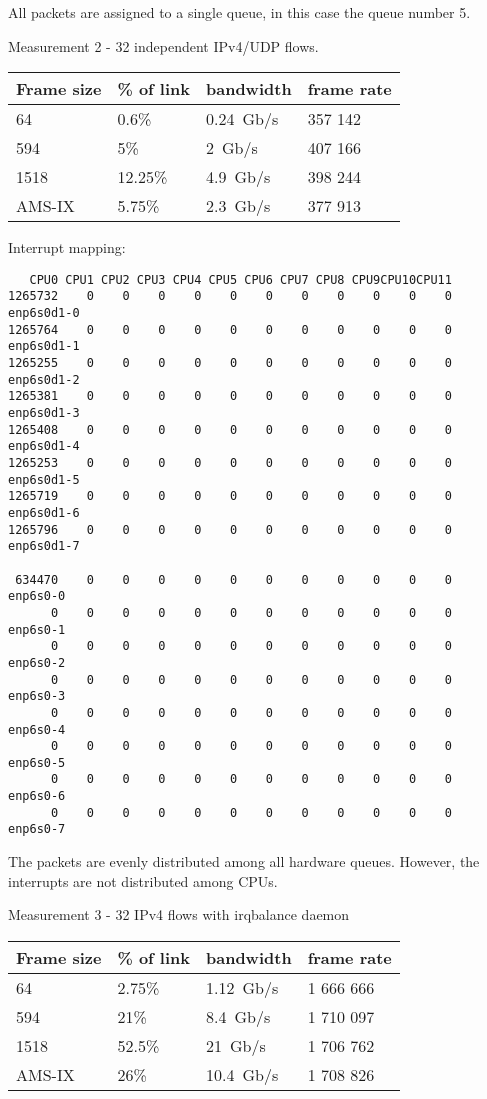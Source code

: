 All packets are assigned to a single queue, in this case the queue number 5.


\newpage
Measurement 2 - 32 independent IPv4/UDP flows.

\begin{tabular}{ | l | l | l | l | }
\hline
Frame size & \% of link & bandwidth & frame rate \\
\hline
64     & 0.6\%   & 0.24~Gb/s & 357 142 \\ %
594    & 5\%     & 2~Gb/s    & 407 166 \\ %
1518   & 12.25\% & 4.9~Gb/s  & 398 244 \\ %
AMS-IX & 5.75\%  & 2.3~Gb/s  & 377 913 \\ %
\hline
\end{tabular}

Interrupt mapping:
\begin{lstlisting}
   CPU0 CPU1 CPU2 CPU3 CPU4 CPU5 CPU6 CPU7 CPU8 CPU9CPU10CPU11 
1265732    0    0    0    0    0    0    0    0    0    0    0  enp6s0d1-0
1265764    0    0    0    0    0    0    0    0    0    0    0  enp6s0d1-1
1265255    0    0    0    0    0    0    0    0    0    0    0  enp6s0d1-2
1265381    0    0    0    0    0    0    0    0    0    0    0  enp6s0d1-3
1265408    0    0    0    0    0    0    0    0    0    0    0  enp6s0d1-4
1265253    0    0    0    0    0    0    0    0    0    0    0  enp6s0d1-5
1265719    0    0    0    0    0    0    0    0    0    0    0  enp6s0d1-6
1265796    0    0    0    0    0    0    0    0    0    0    0  enp6s0d1-7

 634470    0    0    0    0    0    0    0    0    0    0    0  enp6s0-0
      0    0    0    0    0    0    0    0    0    0    0    0  enp6s0-1
      0    0    0    0    0    0    0    0    0    0    0    0  enp6s0-2
      0    0    0    0    0    0    0    0    0    0    0    0  enp6s0-3
      0    0    0    0    0    0    0    0    0    0    0    0  enp6s0-4
      0    0    0    0    0    0    0    0    0    0    0    0  enp6s0-5
      0    0    0    0    0    0    0    0    0    0    0    0  enp6s0-6
      0    0    0    0    0    0    0    0    0    0    0    0  enp6s0-7
\end{lstlisting}
The packets are evenly distributed among all hardware queues.
However, the interrupts are not distributed among CPUs.


\newpage
Measurement 3 - 32 IPv4 flows with irqbalance daemon

\begin{tabular}{ | l | l | l | l | }
\hline
Frame size & \% of link & bandwidth & frame rate \\
\hline
64     & 2.75\% & 1.12~Gb/s & 1 666 666 \\ %
594    & 21\%   & 8.4~Gb/s  & 1 710 097 \\ %
1518   & 52.5\% & 21~Gb/s   & 1 706 762 \\ %
AMS-IX & 26\%   & 10.4~Gb/s & 1 708 826 \\ %
\hline
\end{tabular}

